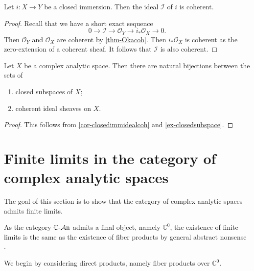 \begin{corollary}\label{cor-closedimmidealcoh}
    Let $i:X\rightarrow Y$ be a closed immersion. Then the ideal $\mathcal{I}$ of $i$ is coherent.
\end{corollary}
\begin{proof}
    Recall that we have a short exact sequence 
    \[
        0\rightarrow \mathcal{I} \rightarrow \mathcal{O}_Y\rightarrow i_*\mathcal{O}_X\rightarrow 0.
    \]
    Then $\mathcal{O}_Y$ and $\mathcal{O}_X$ are coherent by \cref{thm-Okacoh}. Then $i_*\mathcal{O}_X$ is coherent as the zero-extension of a coherent sheaf. It follows that $\mathcal{I}$ is also coherent.
\end{proof}



\begin{corollary}
    Let $X$ be a complex analytic space. Then there are natural bijections between the sets of
    \begin{enumerate}
        \item closed subspaces of $X$;
        \item coherent ideal sheaves on $X$.
    \end{enumerate}
\end{corollary}
\begin{proof}
    This follows from \cref{cor-closedimmidealcoh} and \cref{ex-closedsubspace}.
\end{proof}


\section{Finite limits in the category of complex analytic spaces}

The goal of this section is to show that the category of complex analytic spaces admits finite limits.

As the category $\mathbb{C}\text{-}\mathcal{A}\mathrm{n}$ admits a final object, namely $\mathbb{C}^0$, the existence of finite limits is the same as the existence of fiber products by general abstract nonsense \cite[\href{https://stacks.math.columbia.edu/tag/002O}{Tag 002O}]{stacks-project}.

We begin by considering direct products, namely fiber products over $\mathbb{C}^0$. 

